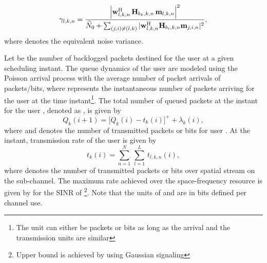 \begin{equation}\label{eq:SINR}
\gamma_{l,k,n} = \dfrac{\left |\mvec{w}{l,k,n}^\herm \, \mvec{H}{b_k,k,n} \, \mvec{m}{l,k,n} \right |^2}{\enoise + \sum_{(j,i) \neq (l,k)} |\mvec{w}{l,k,n}^\herm \mvec{H}{b_i,k,n} \mvec{m}{j,i,n} |^2},
\end{equation}
where  denotes the equivalent noise variance. 

Let  be the number of backlogged packets destined for the user  at a given scheduling instant. The queue dynamics of the user  are modeled using the Poisson arrival process with the average number of packet arrivals of  packets/bits, where  represents the instantaneous number of packets arriving for the user  at the  time instant\footnote{The unit can either be packets or bits as long as the arrival and the transmission units are similar}. The total number of queued packets at the  instant for the user , denoted as , is given by
\begin{equation}
Q_k(i+1) = \Big [ Q_k(i) - t_k(i) \Big ]^+ + \lambda_k(i),
\label{eqn-2a}
\end{equation}
where  and  denotes the number of transmitted packets or bits for user . At the  instant, transmission rate of the user  is given by
\begin{equation}
t_k(i) = \sum_{n = 1}^N \, \sum_{l = 1}^L \, t_{l,k,n}(i),
\end{equation}
where  denotes the number of transmitted packets or bits over  spatial stream on the  sub-channel. The maximum rate achieved over the  space-frequency resource is given by  for the \ac{SINR} of \footnote{Upper bound is achieved by using Gaussian signaling}. Note that the units of  and  are in bits defined per channel use. 